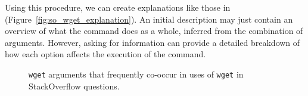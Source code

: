 Using this procedure, we can create explanations like those in (Figure~\ref{fig:so_wget_explanation}). 
An initial description may just contain an overview of what the command does as a whole, inferred from the combination of arguments.
However, asking for information can provide a detailed breakdown of how each option affects the execution of the command.

\begin{figure}
\caption{\texttt{wget} arguments that frequently co-occur in uses of \texttt{wget} in StackOverflow questions. }
\label{fig:wget_arguments}
\end{figure}
